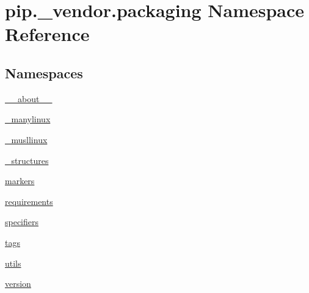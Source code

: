 \hypertarget{namespacepip_1_1__vendor_1_1packaging}{}\section{pip.\+\_\+vendor.\+packaging Namespace Reference}
\label{namespacepip_1_1__vendor_1_1packaging}
\subsection*{Namespaces}
\begin{DoxyCompactItemize}
\item 
 \hyperlink{namespacepip_1_1__vendor_1_1packaging_1_1____about____}{\+\_\+\+\_\+about\+\_\+\+\_\+}
\item 
 \hyperlink{namespacepip_1_1__vendor_1_1packaging_1_1__manylinux}{\+\_\+manylinux}
\item 
 \hyperlink{namespacepip_1_1__vendor_1_1packaging_1_1__musllinux}{\+\_\+musllinux}
\item 
 \hyperlink{namespacepip_1_1__vendor_1_1packaging_1_1__structures}{\+\_\+structures}
\item 
 \hyperlink{namespacepip_1_1__vendor_1_1packaging_1_1markers}{markers}
\item 
 \hyperlink{namespacepip_1_1__vendor_1_1packaging_1_1requirements}{requirements}
\item 
 \hyperlink{namespacepip_1_1__vendor_1_1packaging_1_1specifiers}{specifiers}
\item 
 \hyperlink{namespacepip_1_1__vendor_1_1packaging_1_1tags}{tags}
\item 
 \hyperlink{namespacepip_1_1__vendor_1_1packaging_1_1utils}{utils}
\item 
 \hyperlink{namespacepip_1_1__vendor_1_1packaging_1_1version}{version}
\end{DoxyCompactItemize}
